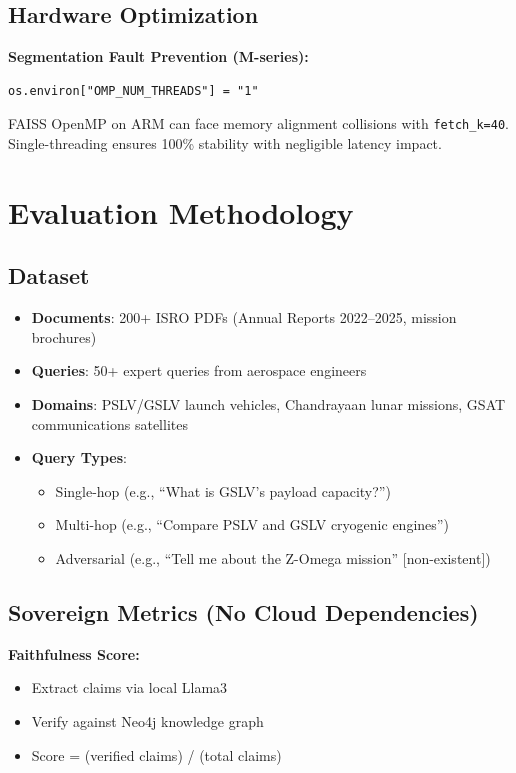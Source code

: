 \documentclass[journal,12pt,twocolumn]{IEEEtran}
\begin{document}
\subsection{Hardware Optimization}

\textbf{Segmentation Fault Prevention (M-series):}
\begin{verbatim}
os.environ["OMP_NUM_THREADS"] = "1"
\end{verbatim}

FAISS OpenMP on ARM can face memory alignment collisions with \texttt{fetch\_k=40}. Single-threading ensures 100\% stability with negligible latency impact.

\section{Evaluation Methodology}

\subsection{Dataset}

\begin{itemize}
\item \textbf{Documents}: 200+ ISRO PDFs (Annual Reports 2022--2025, mission brochures)
\item \textbf{Queries}: 50+ expert queries from aerospace engineers
\item \textbf{Domains}: PSLV/GSLV launch vehicles, Chandrayaan lunar missions, GSAT communications satellites
\item \textbf{Query Types}: 
  \begin{itemize}
  \item Single-hop (e.g., ``What is GSLV's payload capacity?'')
  \item Multi-hop (e.g., ``Compare PSLV and GSLV cryogenic engines'')
  \item Adversarial (e.g., ``Tell me about the Z-Omega mission'' [non-existent])
  \end{itemize}
\end{itemize}

\subsection{Sovereign Metrics (No Cloud Dependencies)}

\textbf{Faithfulness Score:}
\begin{itemize}
\item Extract claims via local Llama3
\item Verify against Neo4j knowledge graph
\item Score = (verified claims) / (total claims)
\end{itemize}
\end{document}
